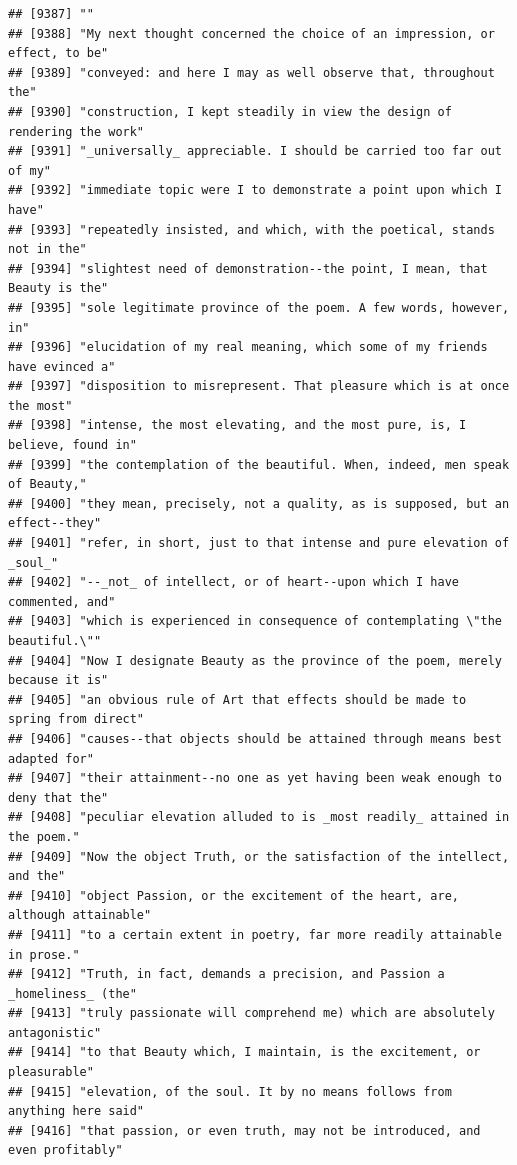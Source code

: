 \documentclass{article}\usepackage[]{graphicx}\usepackage[]{color}
\makeatletter
\newenvironment{kframe}{%
 \def\at@end@of@kframe{}%
 \ifinner\ifhmode%
  \def\at@end@of@kframe{\end{minipage}}%
  \begin{minipage}{\columnwidth}%
 \fi\fi%
 \def\FrameCommand##1{\hskip\@totalleftmargin \hskip-\fboxsep
 \colorbox{shadecolor}{##1}\hskip-\fboxsep
     \hskip-\linewidth \hskip-\@totalleftmargin \hskip\columnwidth}%
 \MakeFramed {\advance\hsize-\width
   \@totalleftmargin\z@ \linewidth\hsize
   \@setminipage}}%
 {\par\unskip\endMakeFramed%
 \at@end@of@kframe}
\newenvironment{knitrout}{}{} %
\makeatother
\begin{document}
\begin{knitrout}
\begin{kframe}
\begin{verbatim}
## [9387] ""                                                                            
## [9388] "My next thought concerned the choice of an impression, or effect, to be"     
## [9389] "conveyed: and here I may as well observe that, throughout the"               
## [9390] "construction, I kept steadily in view the design of rendering the work"      
## [9391] "_universally_ appreciable. I should be carried too far out of my"            
## [9392] "immediate topic were I to demonstrate a point upon which I have"             
## [9393] "repeatedly insisted, and which, with the poetical, stands not in the"        
## [9394] "slightest need of demonstration--the point, I mean, that Beauty is the"      
## [9395] "sole legitimate province of the poem. A few words, however, in"              
## [9396] "elucidation of my real meaning, which some of my friends have evinced a"     
## [9397] "disposition to misrepresent. That pleasure which is at once the most"        
## [9398] "intense, the most elevating, and the most pure, is, I believe, found in"     
## [9399] "the contemplation of the beautiful. When, indeed, men speak of Beauty,"      
## [9400] "they mean, precisely, not a quality, as is supposed, but an effect--they"    
## [9401] "refer, in short, just to that intense and pure elevation of _soul_"          
## [9402] "--_not_ of intellect, or of heart--upon which I have commented, and"         
## [9403] "which is experienced in consequence of contemplating \"the beautiful.\""     
## [9404] "Now I designate Beauty as the province of the poem, merely because it is"    
## [9405] "an obvious rule of Art that effects should be made to spring from direct"    
## [9406] "causes--that objects should be attained through means best adapted for"      
## [9407] "their attainment--no one as yet having been weak enough to deny that the"    
## [9408] "peculiar elevation alluded to is _most readily_ attained in the poem."       
## [9409] "Now the object Truth, or the satisfaction of the intellect, and the"         
## [9410] "object Passion, or the excitement of the heart, are, although attainable"    
## [9411] "to a certain extent in poetry, far more readily attainable in prose."        
## [9412] "Truth, in fact, demands a precision, and Passion a _homeliness_ (the"        
## [9413] "truly passionate will comprehend me) which are absolutely antagonistic"      
## [9414] "to that Beauty which, I maintain, is the excitement, or pleasurable"         
## [9415] "elevation, of the soul. It by no means follows from anything here said"      
## [9416] "that passion, or even truth, may not be introduced, and even profitably"     

\end{verbatim}
\end{kframe}
\end{knitrout}
\end{document}
